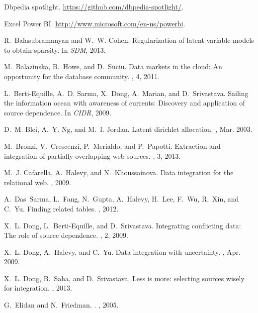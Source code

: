 \documentclass{sig-alternate}
\begin{document}
\begin{thebibliography}{10}

Dbpedia spotlight.
\newblock \url{https://github.com/dbpedia-spotlight/}.

Excel Power BI.
\newblock \url{http://www.microsoft.com/en-us/powerbi}.

R.~Balasubramanyan and W.~W. Cohen.
\newblock Regularization of latent variable models to obtain sparsity.
\newblock In {\em SDM}, 2013.

M.~Balazinska, B.~Howe, and D.~Suciu.
\newblock Data markets in the cloud: An opportunity for the database community.
, 4, 2011.

L.~Berti-Equille, A.~D. Sarma, X.~Dong, A.~Marian, and D.~Srivastava.
\newblock Sailing the information ocean with awareness of currents: Discovery
  and application of source dependence.
\newblock In {\em CIDR}, 2009.

D.~M. Blei, A.~Y. Ng, and M.~I. Jordan.
\newblock Latent dirichlet allocation.
, Mar. 2003.

M.~Bronzi, V.~Crescenzi, P.~Merialdo, and P.~Papotti.
\newblock Extraction and integration of partially overlapping web sources.
, 3, 2013.

M.~J. Cafarella, A.~Halevy, and N.~Khoussainova.
\newblock Data integration for the relational web.
, 2009.

A.~Das~Sarma, L.~Fang, N.~Gupta, A.~Halevy, H.~Lee, F.~Wu, R.~Xin, and C.~Yu.
\newblock Finding related tables.
, 2012.

X.~L. Dong, L.~Berti-Equille, and D.~Srivastava.
\newblock Integrating conflicting data: The role of source dependence.
, 2, 2009.

X.~L. Dong, A.~Halevy, and C.~Yu.
\newblock Data integration with uncertainty.
, Apr. 2009.

X.~L. Dong, B.~Saha, and D.~Srivastava.
\newblock Less is more: selecting sources wisely for integration.
, 2013.

G.~Elidan and N.~Friedman.
.
, 2005.


\end{thebibliography}
\end{document}
